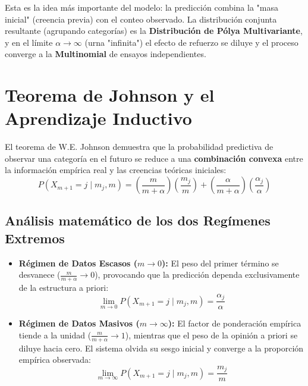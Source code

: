 \documentclass[10pt]{book}
\begin{document}
\noindent
Esta es la idea más importante del modelo: la predicción combina la "masa inicial" (creencia previa) con el conteo observado. La distribución conjunta resultante (agrupando categorías) es la \textbf{Distribución de Pólya Multivariante}, y en el límite $\alpha\to\infty$ (urna "infinita") el efecto de refuerzo se diluye y el proceso converge a la \textbf{Multinomial} de ensayos independientes.
 

\section{Teorema de Johnson y el Aprendizaje Inductivo}

El teorema de W.E. Johnson demuestra que la probabilidad predictiva de observar una categoría en el futuro se reduce a una \textbf{combinación convexa} entre la información empírica real y las creencias teóricas iniciales:
\begin{equation}
    P(X_{m+1} = j \mid m_j, m) = \left( \frac{m}{m + \alpha} \right) \left( \frac{m_j}{m} \right) + \left( \frac{\alpha}{m + \alpha} \right) \left( \frac{\alpha_j}{\alpha} \right)
\end{equation}

\subsection*{Análisis matemático de los dos Regímenes Extremos}
\begin{itemize}
    \item \textbf{Régimen de Datos Escasos ($m \to 0$):} El peso del primer término se desvanece ($\frac{m}{m+\alpha} \to 0$), provocando que la predicción dependa exclusivamente de la estructura a priori:
    \begin{equation*}
        \lim_{m \to 0} P(X_{m+1} = j \mid m_j, m) = \frac{\alpha_j}{\alpha}
    \end{equation*}
    \item \textbf{Régimen de Datos Masivos ($m \to \infty$):} El factor de ponderación empírica tiende a la unidad ($\frac{m}{m+\alpha} \to 1$), mientras que el peso de la opinión a priori se diluye hacia cero. El sistema olvida su sesgo inicial y converge a la proporción empírica observada:
    \begin{equation*}
        \lim_{m \to \infty} P(X_{m+1} = j \mid m_j, m) = \frac{m_j}{m}
    \end{equation*}
\end{itemize}
\end{document}
